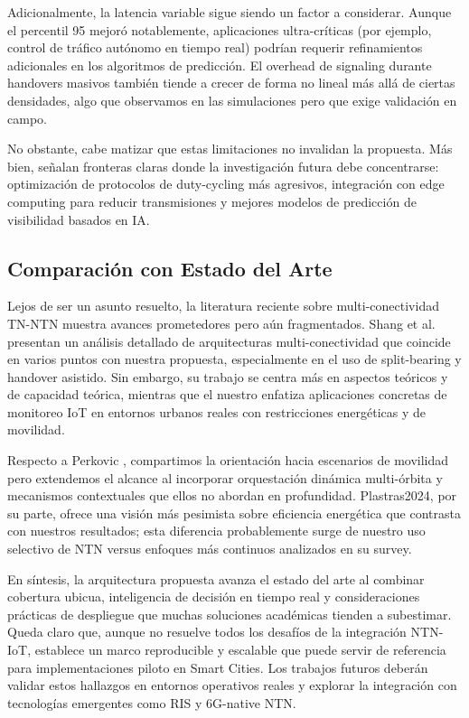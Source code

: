 Adicionalmente, la latencia variable sigue siendo un factor a considerar. Aunque el percentil 95 mejoró notablemente, aplicaciones ultra-críticas (por ejemplo, control de tráfico autónomo en tiempo real) podrían requerir refinamientos adicionales en los algoritmos de predicción. El overhead de signaling durante handovers masivos también tiende a crecer de forma no lineal más allá de ciertas densidades, algo que observamos en las simulaciones pero que exige validación en campo.

No obstante, cabe matizar que estas limitaciones no invalidan la propuesta. Más bien, señalan fronteras claras donde la investigación futura debe concentrarse: optimización de protocolos de duty-cycling más agresivos, integración con edge computing para reducir transmisiones y mejores modelos de predicción de visibilidad basados en IA.

\subsection{Comparación con Estado del Arte}

Lejos de ser un asunto resuelto, la literatura reciente sobre multi-conectividad TN-NTN muestra avances prometedores pero aún fragmentados. Shang et al. \cite{Shang2024} presentan un análisis detallado de arquitecturas multi-conectividad que coincide en varios puntos con nuestra propuesta, especialmente en el uso de split-bearing y handover asistido. Sin embargo, su trabajo se centra más en aspectos teóricos y de capacidad teórica, mientras que el nuestro enfatiza aplicaciones concretas de monitoreo IoT en entornos urbanos reales con restricciones energéticas y de movilidad.

Respecto a Perkovic \cite{Perkovic2025}, compartimos la orientación hacia escenarios de movilidad pero extendemos el alcance al incorporar orquestación dinámica multi-órbita y mecanismos contextuales que ellos no abordan en profundidad. Plastras2024, por su parte, ofrece una visión más pesimista sobre eficiencia energética que contrasta con nuestros resultados; esta diferencia probablemente surge de nuestro uso selectivo de NTN versus enfoques más continuos analizados en su survey.

En síntesis, la arquitectura propuesta avanza el estado del arte al combinar cobertura ubicua, inteligencia de decisión en tiempo real y consideraciones prácticas de despliegue que muchas soluciones académicas tienden a subestimar. Queda claro que, aunque no resuelve todos los desafíos de la integración NTN-IoT, establece un marco reproducible y escalable que puede servir de referencia para implementaciones piloto en Smart Cities. Los trabajos futuros deberán validar estos hallazgos en entornos operativos reales y explorar la integración con tecnologías emergentes como RIS y 6G-native NTN.